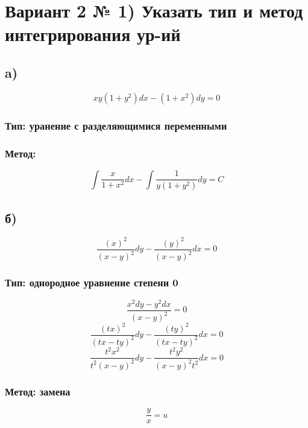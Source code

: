 \documentclass[a4paper]{article}
\begin{document}
\section*{Вариант 2 \newline № 1) Указать тип и метод интегрирования ур-ий}
\subsection*{a)}
\begin{equation*}
xy(1 + y^2)dx - (1 + x^2)dy = 0
\end{equation*}
\subsubsection*{Тип: уранение с разделяющимися переменными}

\subsubsection*{Метод:}
\begin{equation*}
\int\frac{x}{1 + x^2}dx - \int\frac{1}{y(1+y^2)}dy = C
\end{equation*}

\subsection*{б)}
\begin{equation*}
\frac{(x)^2}{(x - y)^2}dy - \frac{(y)^2}{(x - y)^2}dx = 0
\end{equation*}
\subsubsection*{Тип: однородное уравнение степени 0}

\begin{equation*}
\frac{x^2dy - y^2dx}{(x - y)^2} = 0
\end{equation*}
\begin{equation*}
\frac{(tx)^2}{(tx - ty)^2}dy - \frac{(ty)^2}{(tx - ty)^2}dx = 0
\end{equation*}
\begin{equation*}
\frac{t^2x^2}{t^2(x - y)^2}dy - \frac{t^2y^2}{(x - y)^2t^2}dx = 0
\end{equation*}
\subsubsection*{Метод: замена  }
\begin{equation*}
\frac{y}{x} = u
\end{equation*}
\end{document}
